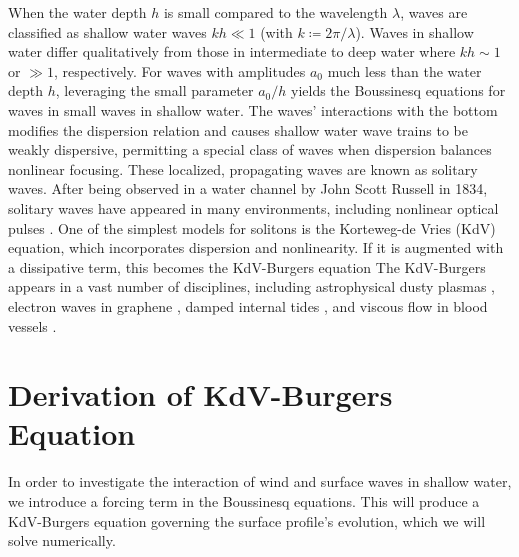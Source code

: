 \documentclass{jfm}
\begin{document}
When the water depth $h$ is small compared to the wavelength $\lambda$,
waves are classified as shallow water waves $kh \ll 1$ (with $k
\coloneqq 2 \pi/\lambda$).
Waves in shallow water differ qualitatively from those in intermediate
to deep water where $kh \sim 1$ or $\gg 1$, respectively.
For waves with amplitudes $a_0$ much less than the water depth $h$,
leveraging the small parameter $a_0/h$ yields the Boussinesq equations
for waves in small waves in shallow water.
The waves' interactions with the bottom modifies the dispersion relation
and causes shallow water wave trains to be weakly dispersive, permitting
a special class of waves when dispersion balances nonlinear focusing.
These localized, propagating waves are known as solitary waves.
After being observed in a water channel by John Scott Russell in 1834,
solitary waves have appeared in many environments, including
nonlinear optical pulses \citep[\eg][]{kivshar1993dark}.
One of the simplest models for solitons is the Korteweg-de Vries (KdV)
equation, which incorporates dispersion and nonlinearity.
If it is augmented with a dissipative term, this becomes the KdV-Burgers
equation
The KdV-Burgers appears in a vast number of disciplines, including
astrophysical dusty plasmas \citep[\eg][]{sahu2012nonextensive},
electron waves in graphene \citep[\eg][]{zdyrski2019effects},
damped internal tides \citep[\eg][]{sandstrom1995dissipation},
and viscous flow in blood vessels \citep[\eg][]{antar1999weakly}.

\section{Derivation of KdV-Burgers Equation}
In order to investigate the interaction of wind and surface waves in
shallow water, we introduce a forcing term in the Boussinesq equations.
This will produce a KdV-Burgers equation governing the surface profile's
evolution, which we will solve numerically.
\end{document}
